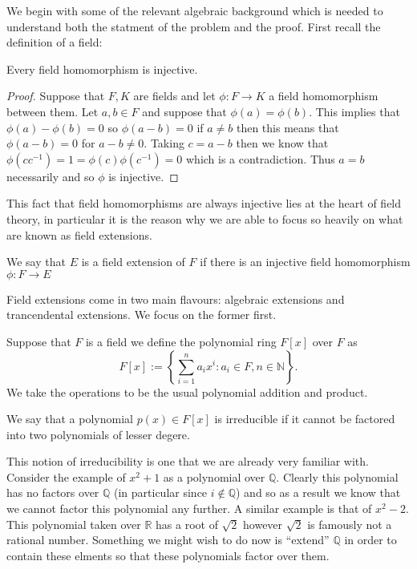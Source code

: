 We begin with some of the relevant algebraic background which is needed to
understand both the statment of the problem and the proof. First recall the
definition of a field:

\begin{propn}
  Every field homomorphism is injective.
\end{propn}
\begin{proof}
  Suppose that $F, K$ are fields and let $\phi: F \to K$ a field homomorphism
  between them. Let $a, b \in F$ and suppose that $\phi(a) = \phi(b)$. This
  implies that $\phi(a) - \phi(b) = 0$ so $\phi(a - b) = 0$ if $a \neq b$ then
  this means that $\phi(a-b) = 0$ for $a - b \neq 0$. Taking $c = a-b$ then we
  know that $\phi(cc^{-1}) = 1 = \phi(c)\phi(c^{-1}) = 0$ which is
  a contradiction. Thus $a = b$ necessarily and so $\phi$ is injective.
\end{proof}

This fact that field homomorphisms are always injective lies at the heart of
field theory, in particular it is the reason why we are able to focus so
heavily on what are known as field extensions. 

\begin{defn}
  We say that $E$ is a field extension of $F$ if there is an injective field
  homomorphism $\phi: F \to E$
\end{defn}

Field extensions come in two main flavours: algebraic extensions and
trancendental extensions. We focus on the former first.

\begin{defn}
  Suppose that $F$ is a field we define the polynomial ring  $F[x]$ over $F$ as
  \[
    F[x] := \left\{\sum_{i=1}^{n}a_{i}x^{i}: a_{i} \in F, n \in
    \mathbb{N}\right\} 
  .\]
  We take the operations to be the usual polynomial addition and product.
\end{defn}

\begin{defn}[Irreducible]
  We say that a polynomial $p(x) \in F[x]$ is irreducible if it cannot be
  factored into two polynomials of lesser degere.
\end{defn}

This notion of irreducibility is one that we are already very familiar with.
Consider the example of $x^2 + 1$ as a polynomial over $\mathbb{Q}$. Clearly
this polynomial has no factors over $\mathbb{Q}$ (in particular since $i
\not\in \mathbb{Q}$) and so as a result we know
that we cannot factor this polynomial any further. A similar example is that of
$x^2 - 2$. This polynomial taken over $\mathbb{R}$ has a root of $\sqrt{2}$
however $\sqrt{2}$ is famously not a rational number. Something we might wish
to do now is ``extend'' $\mathbb{Q}$ in order to contain these elments so that
these polynomials factor over them.

